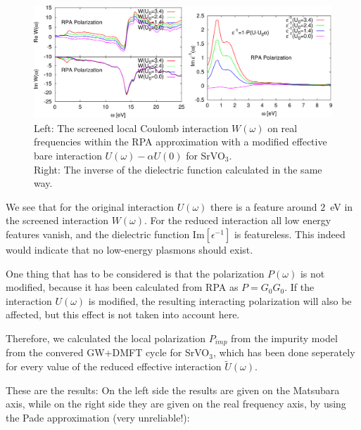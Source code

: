 \documentclass[12pt,a4paper]{scrartcl}
\numberwithin{equation}{section}
\begin{document}
\begin{figure}[h]
\includegraphics[width=1\textwidth]{figs/plasmonanalysis/modified_UPW.pdf} 
\caption{Left: The screened local Coulomb interaction $W(\omega)$
on real frequencies within the RPA approximation with a modified
effective bare interaction $U(\omega)-\alpha U(0)$ for SrVO$_3$.\\
Right: The inverse of the dielectric function calculated in the same way.
}
\end{figure}

We see that for the original interaction $U(\omega)$ there is
a feature around $2$~eV in the screened interaction $W(\omega)$.
For the reduced interaction all low energy features vanish, 
and the dielectric function Im$[\epsilon^{-1}]$ is featureless.
This indeed would indicate that no low-energy plasmons should exist.

One thing that has to be considered is that the polarization $P(\omega)$
is not modified, because it has been calculated from RPA as $P=G_0G_0$.
If the interaction $U(\omega)$ is modified, the resulting
interacting polarization will also be affected, but this effect
is not taken into account here.

Therefore, we calculated the local polarization $P_{imp}$
from the impurity model from the convered GW+DMFT cycle for SrVO$_3$,
which has been done seperately for every value of the reduced
effective interaction $\tilde{U}(\omega)$.


These are the results: 
On the left side the results are given on the Matsubara axis, while on the right
side they are given on the real frequency axis, by using the Pade approximation (very unreliable!):
\end{document}
